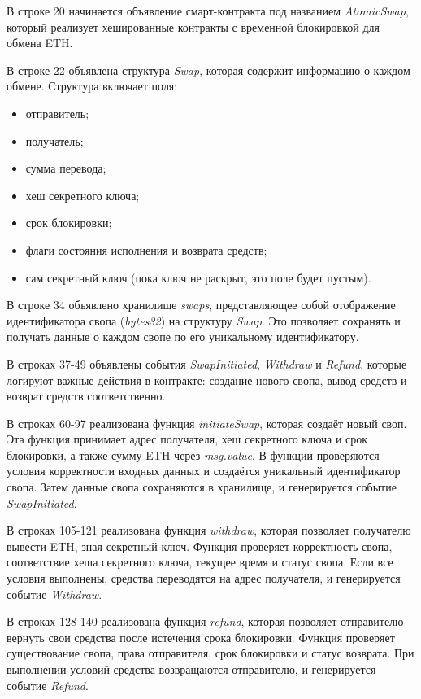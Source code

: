 В строке 20 начинается объявление смарт-контракта под названием \textit{AtomicSwap}, который реализует хешированные контракты с временной блокировкой для обмена ETH.

В строке 22 объявлена структура \textit{Swap}, которая содержит информацию о каждом обмене. Структура включает поля: 
\begin{itemize}
\item отправитель;
\item получатель;
\item сумма перевода;
\item хеш секретного ключа;
\item срок блокировки;
\item флаги состояния исполнения и возврата средств;
\item сам секретный ключ (пока ключ не раскрыт, это поле будет пустым).
\end{itemize}

В строке 34 объявлено хранилище \textit{swaps}, представляющее собой отображение идентификатора свопа (\textit{bytes32}) на структуру \textit{Swap}. Это позволяет сохранять и получать данные о каждом свопе по его уникальному идентификатору.

В строках 37-49 объявлены события \textit{SwapInitiated}, \textit{Withdraw} и \textit{Refund}, которые логируют важные действия в контракте: создание нового свопа, вывод средств и возврат средств соответственно.

В строках 60-97 реализована функция \textit{initiateSwap}, которая создаёт новый своп. Эта функция принимает адрес получателя, хеш секретного ключа и срок блокировки, а также сумму ETH через \textit{msg.value}. В функции проверяются условия корректности входных данных и создаётся уникальный идентификатор свопа. Затем данные свопа сохраняются в хранилище, и генерируется событие \textit{SwapInitiated}.

В строках 105-121 реализована функция \textit{withdraw}, которая позволяет получателю вывести ETH, зная секретный ключ. Функция проверяет корректность свопа, соответствие хеша секретного ключа, текущее время и статус свопа. Если все условия выполнены, средства переводятся на адрес получателя, и генерируется событие \textit{Withdraw}.

В строках 128-140 реализована функция \textit{refund}, которая позволяет отправителю вернуть свои средства после истечения срока блокировки. Функция проверяет существование свопа, права отправителя, срок блокировки и статус возврата. При выполнении условий средства возвращаются отправителю, и генерируется событие \textit{Refund}.

